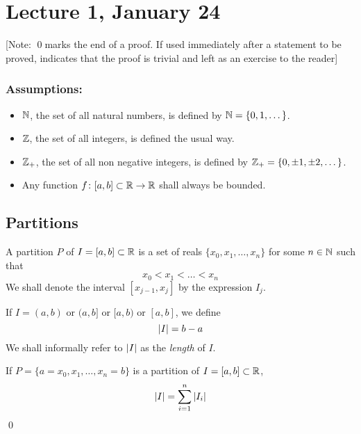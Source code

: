 \chapter*{Lecture 1, January 24}
\setcounter{chapter}{1}
\setcounter{section}{0}

[Note: \qed \quad marks the end of a proof. If used immediately after a statement to be proved, indicates that the proof is trivial and left as an exercise to the reader]

\subsection*{Assumptions:}

\begin{itemize}
\item
  $\mathbb{N}$, the set of all natural numbers, is defined by $\mathbb{N} = \{0, 1, \dots \}$.

\item
  $\mathbb{Z}$, the set of all integers, is defined the usual way.
  
\item
  $\mathbb{Z}_+$, the set of all non negative integers, is defined by $\mathbb{Z}_+ = \{0, \pm 1, \pm 2, \dots \}$.

\item
  Any function $f \colon [a, b] \subset \mathbb{R} \to \mathbb{R}$ shall always be bounded.

\end{itemize}

\section{Partitions}

\begin{defn}
  A partition $P$ of $I = [a, b] \subset \mathbb{R}$ is a set of reals $\{x_0, x_1, \dots ,x_n \}$ for some $n \in \mathbb{N}$ such that
  \[
    x_0 < x_1 < \dots < x_n
  \]
  We shall denote the interval $[x_{j-1}, x_j]$ by the expression $I_j$.
\end{defn}

\begin{defn}
  If $I = (a, b)$ or $(a, b]$ or $[a, b)$ or $[a, b]$, we define
  \[
    \abs{I} = b - a
  \]
  We shall informally refer to $\abs{I}$ as the \textit{length} of $I$.
\end{defn}

\begin{claim}
  If $P = \{a = x_0, x_1, \dots ,x_n = b \}$ is a partition of $I = [a, b] \subset \mathbb{R}$,
  \[
    \abs{I} = \sum_{i=1}^n \abs{I_i}
  \]
  \hfill\qed
\end{claim}

